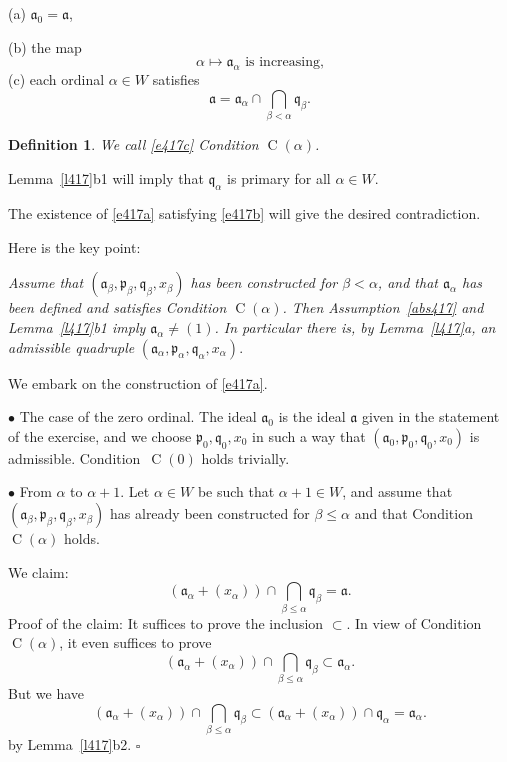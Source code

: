\documentclass[parskip=half,fontsize=12pt]{scrartcl}%
\newcommand{\oo}{\operatorname}\newcommand{\ooo}{\operatorname*}
\newcommand{\mf}{\mathfrak}
\newcommand{\aaa}{\mf a}
\newcommand{\ppp}{\mf p}
\newcommand{\qqq}{\mf q}
\newcommand{\bu}{\bullet}
\newtheorem{df}[thm]{Definition}
\begin{document}
(a) $\aaa_0=\aaa$, 

(b) the map 
\begin{equation}\label{e417b}
\alpha\mapsto\aaa_\alpha\text{ is increasing,}
\end{equation} 
(c) each ordinal $\alpha\in W$ satisfies 
\begin{equation}\label{e417c}
\aaa=\aaa_\alpha\cap\bigcap_{\beta<\alpha}\qqq_\beta.
\end{equation}
\begin{df}\label{calpha}
We call \eqref{e417c} Condition $\oo C(\alpha)$. 
\end{df}

Lemma~\ref{l417}b1 will imply that $\qqq_\alpha$ is primary for all $\alpha\in W$. 

The existence of \eqref{e417a} satisfying \eqref{e417b} will give the desired contradiction.

Here is the key point:

\emph{Assume that $(\aaa_\beta,\ppp_\beta,\qqq_\beta,x_\beta)$ has been constructed for $\beta<\alpha$, and that $\aaa_\alpha$ has been defined and satisfies Condition $\oo C(\alpha)$. Then Assumption~\eqref{abs417} and Lemma~\ref{l417}b1 imply $\aaa_\alpha\ne(1)$. In particular there is, by Lemma~\ref{l417}a, an admissible quadruple} $(\aaa_\alpha,\ppp_\alpha,\qqq_\alpha,x_\alpha)$.

We embark on the construction of \eqref{e417a}.

$\bu$ The case of the zero ordinal. The ideal $\aaa_0$ is the ideal $\aaa$ given in the statement of the exercise, and we choose $\ppp_0,\qqq_0,x_0$ in such a way that $(\aaa_0,\ppp_0,\qqq_0,x_0)$ is admissible. Condition~$\oo C(0)$ holds trivially.

$\bu$ From $\alpha$ to $\alpha+1$. Let $\alpha\in W$ be such that $\alpha+1\in W$, and assume that $(\aaa_\beta,\ppp_\beta,\qqq_\beta,x_\beta)$ has already been constructed for $\beta\le\alpha$ and that Condition $\oo C(\alpha)$ holds. 

We claim: 
$$
(\aaa_\alpha+(x_\alpha))\cap\bigcap_{\beta\le\alpha}\qqq_\beta=\aaa.
$$ 
Proof of the claim: It suffices to prove the inclusion $\subset$. In view of Condition $\oo C(\alpha)$, it even suffices to prove 
$$
(\aaa_\alpha+(x_\alpha))\cap\bigcap_{\beta\le\alpha}\qqq_\beta\subset\aaa_\alpha.
$$ 
But we have 
$$
(\aaa_\alpha+(x_\alpha))\cap\bigcap_{\beta\le\alpha}\qqq_\beta\subset(\aaa_\alpha+(x_\alpha))\cap\qqq_\alpha=\aaa_\alpha.
$$ 
by Lemma~\ref{l417}b2. $\square$
\end{document}
